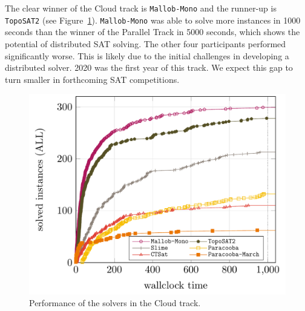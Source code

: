 \documentclass{elsarticle}
\newcommand{\solver}[1]{\texttt{#1}}
\begin{document}
The clear winner of the Cloud track is \solver{Mallob-Mono} and the runner-up is \solver{TopoSAT2}
(see Figure~\ref{fig:res-cloud}).
\solver{Mallob-Mono} was able to solve more instances in 1000 seconds than the 
winner of the Parallel Track in 5000 seconds, which shows the potential of distributed SAT solving. 
The other four participants performed significantly worse. This is likely due to the initial challenges
in developing a distributed solver. 2020 was the first year of this track. We expect this gap to turn smaller in 
forthcoming SAT competitions.


\begin{figure}
\centering
\includegraphics[width=.9\textwidth]{img/cloud-ALL.pdf}
\caption{Performance of the solvers in the Cloud track.}
\label{fig:res-cloud}
\end{figure}
\end{document}

